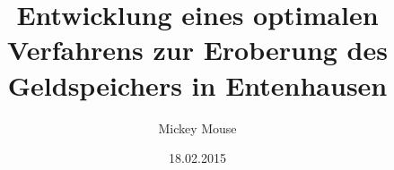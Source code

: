 \documentclass[%
  english,ngerman,%
  BCOR=6mm,%
  cdgeometry=false,%
  DIV=14,%
  paper=a5,%
  fontsize=5pt,%
  twoside=true,%
  chapterpage=false
]{tudscrposter}
\begin{document}
	\date{18.02.2015}
	\author{Mickey Mouse}
	\title{%
		Entwicklung eines optimalen Verfahrens zur Eroberung des
		Geldspeichers in Entenhausen
	}
	\maketitle
\end{document}
